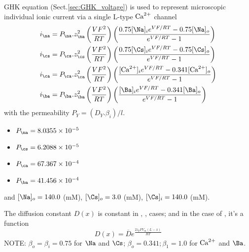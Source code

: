 GHK equation (Sect.\ref{sec:GHK_voltage}) is used to represent
microscopic individual ionic current via a single L-type ${\text{Ca}^{2+}}$ channel
\begin{equation}
\begin{split}
i_\na &= P_\na .z_\na^2 \left( \frac{VF^2}{RT}\right) \left( \frac{0.75
[\Na]_i e^{VF/RT} - 0.75 [\Na]_o}{e^{VF/RT} - 1} \right) \\
i_\cs &= P_\cs .z_\cs^2 \left( \frac{VF^2}{RT}\right) \left( \frac{0.75
[\Cs]_i e^{VF/RT} - 0.75 [\Cs]_o}{e^{VF/RT} - 1} \right) \\ 
i_\ca &= P_\ca .z_\ca^2 \left( \frac{VF^2}{RT}\right) \left( \frac{
[\Ca]_i e^{VF/RT} - 0.341 [\Ca]_o}{e^{VF/RT} - 1} \right) \\ 
i_\ba &= P_\ba .z_\ba^2 \left( \frac{VF^2}{RT}\right) \left( \frac{
[\Ba]_i e^{VF/RT} - 0.341 [\Ba]_o}{e^{VF/RT} - 1} \right) \\ 
\end{split} 
\end{equation}
with the permeability $P_Y=(D_Y.\beta_i)/l$. 
\begin{itemize}
  \item $P_\na=8.0355\times 10^{-5}$
  \item $P_\cs=6.2088\times 10^{-5}$
  \item $P_\ca=67.367\times 10^{-4}$
  \item $P_\ba=41.456\times 10^{-4}$ 
\end{itemize}
and $[\Na]_o=140.0$ (mM), $[\Cs]_o=3.0$ (mM), $[\Cs]_i=140.0$ (mM).

The diffusion constant $D(x)$ is constant in , , 
cases; and in the case of , it's a function
\begin{equation}
  \label{eq:868}
  D(x) = \overline{D} e^{\frac{2z_YFV_m(L-x)}{RT}}
\end{equation}
NOTE: $\beta_o=\beta_i=0.75$ for $\Na$ and $\Cs$; $\beta_o=0.341; \beta_1=1.0$
for ${\text{Ca}^{2+}}$ and $\Ba$.

